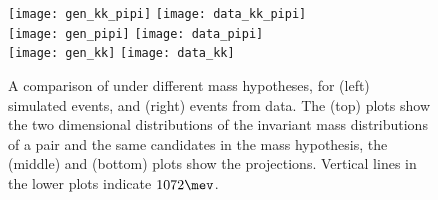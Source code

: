 \begin{figure}
  \begin{center}
    \texttt{[image: gen\_kk\_pipi]}
    \texttt{[image: data\_kk\_pipi]}\\
    \texttt{[image: gen\_pipi]}
    \texttt{[image: data\_pipi]}\\
    \texttt{[image: gen\_kk]}
    \texttt{[image: data\_kk]}
    \caption[Analysis of the \decay{\KS}{\pipi} background under the \kk mass hypothesis]
    {
      A comparison of \decay{\KS}{\pi\pi} under different mass hypotheses, for
      (left) simulated events, and
      (right) events from data.
      The (top) plots show the two dimensional distributions of the invariant mass distributions of
      a \pipi pair and the same candidates in the \kk mass hypothesis, the (middle) and (bottom)
      plots show the projections.
      Vertical lines in the lower plots indicate $1072\mev$.
    }
    \label{fig:db:x1070:2d}
  \end{center}
\end{figure}


